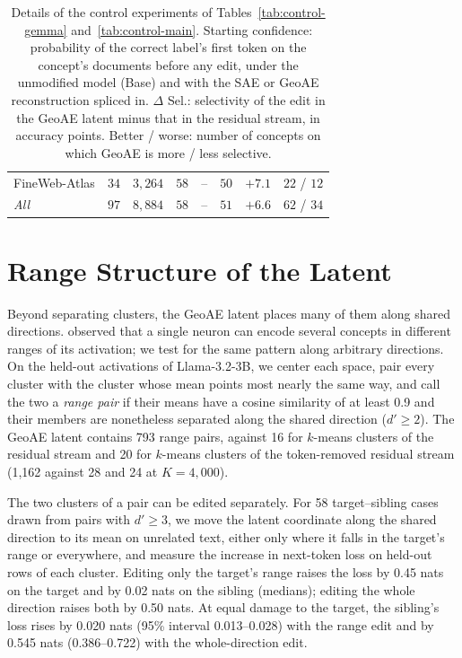 \documentclass[11pt]{article}
\begin{document}
\begin{table}[t]
\begin{tabular}{@{}l rr rrr rc@{}}
\quad FineWeb-Atlas & $34$ & $3{,}264$ & $58$ & -- & $50$ & $+7.1$ & $22$ / $12$ \\
\quad \emph{All} & $97$ & $8{,}884$ & $58$ & -- & $51$ & $+6.6$ & $62$ / $34$ \\
\bottomrule
\end{tabular}
\caption{Details of the control experiments of Tables~\ref{tab:control-gemma} and~\ref{tab:control-main}. Starting confidence: probability of the correct label's first token on the concept's documents before any edit, under the unmodified model (Base) and with the SAE or GeoAE reconstruction spliced in. $\Delta$ Sel.: selectivity of the edit in the GeoAE latent minus that in the residual stream, in accuracy points. Better / worse: number of concepts on which GeoAE is more / less selective.}
\label{tab:control-detail}
\end{table}

\section{Range Structure of the Latent}
\label{app:ranges}

Beyond separating clusters, the GeoAE latent places many of them along shared directions.
\citet{haider2026neurons} observed that a single neuron can encode several concepts in different ranges of its activation; we test for the same pattern along arbitrary directions.
On the held-out activations of Llama-3.2-3B, we center each space, pair every cluster with the cluster whose mean points most nearly the same way, and call the two a \emph{range pair} if their means have a cosine similarity of at least 0.9 and their members are nonetheless separated along the shared direction ($d' \geq 2$).
The GeoAE latent contains 793 range pairs, against 16 for $k$-means clusters of the residual stream and 20 for $k$-means clusters of the token-removed residual stream (1{,}162 against 28 and 24 at $K = 4{,}000$).

The two clusters of a pair can be edited separately.
For 58 target--sibling cases drawn from pairs with $d' \geq 3$, we move the latent coordinate along the shared direction to its mean on unrelated text, either only where it falls in the target's range or everywhere, and measure the increase in next-token loss on held-out rows of each cluster.
Editing only the target's range raises the loss by 0.45 nats on the target and by 0.02 nats on the sibling (medians); editing the whole direction raises both by 0.50 nats.
At equal damage to the target, the sibling's loss rises by 0.020 nats (95\% interval 0.013--0.028) with the range edit and by 0.545 nats (0.386--0.722) with the whole-direction edit.
\end{document}
